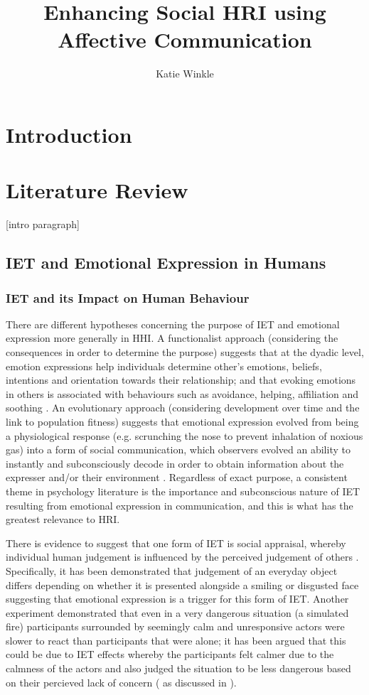 \documentclass[11pt,a4paper]{report}
\title{Enhancing Social HRI using Affective Communication}
\author{Katie Winkle}
\begin{document}
\maketitle
\tableofcontents

\chapter{Introduction}

\chapter{Literature Review}
[intro paragraph]
\section{IET and Emotional Expression in Humans}

\subsection{IET and its Impact on Human Behaviour}
There are different hypotheses concerning the purpose of IET and emotional expression more generally in HHI. A functionalist approach (considering the consequences in order to determine the purpose) suggests that at the dyadic level, emotion expressions help individuals determine other's emotions, beliefs, intentions and orientation towards their relationship; and that evoking emotions in others is associated with behaviours such as avoidance, helping, affiliation and soothing \cite{keltner1999social}. An evolutionary approach (considering development over time and the link to population fitness) suggests that emotional expression evolved from being a physiological response (e.g. scrunching the nose to prevent inhalation of noxious gas) into a form of social communication, which observers evolved an ability to instantly and subconsciously decode in order to obtain information about the expresser and/or their environment \cite{shariff2011emotion}. Regardless of exact purpose, a consistent theme in psychology literature is the importance and subconscious nature of IET resulting from emotional expression in communication, and this is what has the greatest relevance to HRI. 

There is evidence to suggest that one form of IET is social appraisal, whereby individual human judgement is influenced by the perceived judgement of others \cite{parkinson2011interpersonal}. Specifically, it has been demonstrated that judgement of an everyday object differs depending on whether it is presented alongside a smiling or disgusted face \cite{bayliss2007affective} suggesting that emotional expression is a trigger for this form of IET. Another experiment demonstrated that even in a very dangerous situation (a simulated fire) participants surrounded by seemingly calm and unresponsive actors were slower to react than participants that were alone; it has been argued that this could be due to IET effects whereby the participants felt calmer due to the calmness of the actors and also judged the situation to be less dangerous based on their percieved lack of concern (\cite{latane1968group} as discussed in \cite{parkinson2011interpersonal}).
\end{document}
